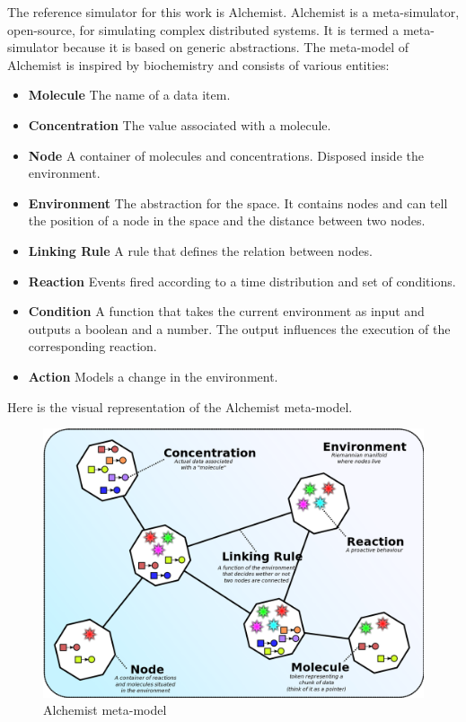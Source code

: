 \documentclass[12pt,a4paper,openright,twoside]{book}
\begin{document}
The reference simulator for this work is Alchemist. \cite{Pianini_2013}
Alchemist is a meta-simulator, open-source, for simulating complex distributed systems. It is termed a meta-simulator because it is based on generic abstractions. 
The meta-model of Alchemist is inspired by biochemistry and consists of various entities:
\begin{itemize}
  \item \textbf{Molecule} The name of a data item.
  \item \textbf{Concentration} The value associated with a molecule.
  \item \textbf{Node} A container of molecules and concentrations. Disposed inside the environment.
  \item \textbf{Environment} The abstraction for the space. It contains nodes and can tell the position of a node in the space and the distance between two nodes.
  \item \textbf{Linking Rule} A rule that defines the relation between nodes.
  \item \textbf{Reaction} Events fired according to a time distribution and set of conditions.
  \item \textbf{Condition} A function that takes the current environment as input and outputs a boolean and a number. The output influences the execution of the corresponding reaction.
  \item \textbf{Action} Models a change in the environment.
\end{itemize}

Here is the visual representation of the Alchemist meta-model.

\begin{figure}[H]
  \centering
  \includegraphics[width=\textwidth]{figures/alchemist-model.png}
  \caption{Alchemist meta-model}
\end{figure}
\end{document}

